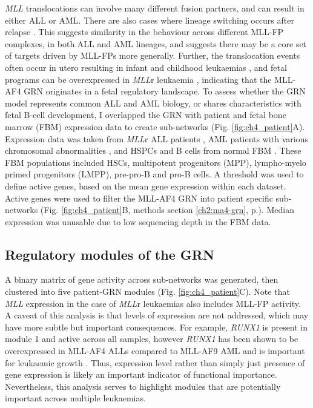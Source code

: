 \textit{MLL} translocations can involve many different fusion partners, and can result in either ALL or AML. There are also cases where lineage switching occurs after relapse \citep{dorantes-acosta_lineage_2012, gardner_acquisition_2016}. This suggests similarity in the behaviour across different MLL-FP complexes, in both ALL and AML lineages, and suggests there may be a core set of targets driven by MLL-FPs more generally. Further, the translocation events often occur in utero resulting in infant and childhood leukaemias \citep{greaves_causal_2018, greaves_utero_2005, ford_utero_1993, jackson_origin_2021}, and fetal programs can be overexpressed in \textit{MLL}r leukaemia \citep{rice_human_2021}, indicating that the MLL-AF4 GRN originates in a fetal regulatory landscape. To assess whether the GRN model represents common ALL and AML biology, or shares characteristics with fetal B-cell development, I overlapped the GRN with patient and fetal bone marrow (FBM) expression data to create sub-networks (Fig. \ref{fig:ch4_patient}A). Expression data was taken from \textit{MLL}r ALL patients \citep{agraz-doblas_unraveling_2019}, AML patients with various chromosomal abnormalities \citep{the_cancer_genome_atlas_research_network_genomic_2013}, and HSPCs and B cells from normal FBM \citep{obyrne_discovery_2019}. These FBM populations included HSCs, multipotent progenitors (MPP), lympho-myelo primed progenitors (LMPP), pre-pro-B and pro-B cells. A threshold was used to define active genes, based on the mean gene expression within each dataset. Active genes were used to filter the MLL-AF4 GRN into patient specific sub-networks (Fig. \ref{fig:ch4_patient}B, methods section \ref{ch2:ma4-grn}, p.\pageref{ch2:ma4-grn}). Median expression was unusable due to low sequencing depth in the FBM data.

\subsection{\label{ch4:patient-modules}Regulatory modules of the GRN}

A binary matrix of gene activity across sub-networks was generated, then clustered into five patient-GRN modules (Fig. \ref{fig:ch4_patient}C). Note that \textit{MLL} expression in the case of \textit{MLL}r leukaemias also includes MLL-FP activity. A caveat of this analysis is that levels of expression are not addressed, which may have more subtle but important consequences. For example, \textit{RUNX1} is present in module 1 and active across all samples, however \textit{RUNX1} has been shown to be overexpressed in MLL-AF4 ALLs compared to MLL-AF9 AML and is important for leukaemic growth \citep{wilkinson_runx1_2013}. Thus, expression level rather than simply just presence of gene expression is likely an important indicator of functional importance. Nevertheless, this analysis serves to highlight modules that are potentially important across multiple leukaemias. 

